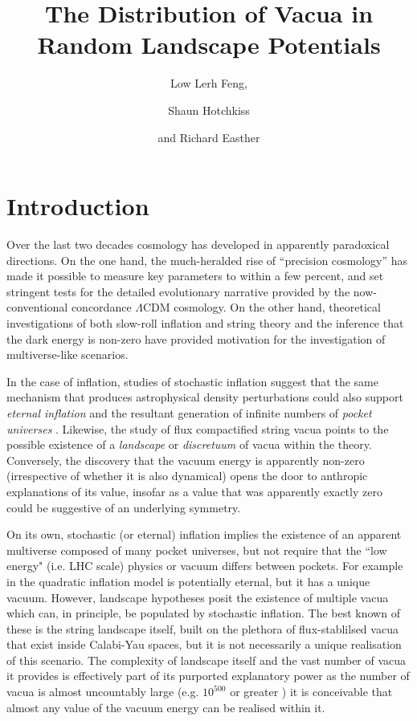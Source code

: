 \documentclass[12pt]{article}
\title{The Distribution of Vacua in Random Landscape Potentials}
\author{Low Lerh Feng,}
\author{Shaun Hotchkiss}
\author{and Richard Easther}
\affiliation{Department of Physics,\\ University of Auckland, \\Private Bag 92019,\\ Auckland, New Zealand}
\begin{document}
\maketitle

\section{Introduction}

Over the last two decades cosmology has developed in apparently paradoxical directions. On the one hand, the much-heralded rise of ``precision cosmology'' has made it possible to measure key parameters to within a few percent, and set stringent tests for the detailed evolutionary narrative provided by the now-conventional concordance $\Lambda$CDM cosmology\cite{Planck2018}\cite{DES}. On the other hand, theoretical investigations of both slow-roll inflation and string theory and the inference that the dark energy is non-zero have  provided motivation for the investigation of multiverse-like scenarios. 

In the case of inflation, studies of stochastic inflation \cite{Linde1986}\cite{Adshead2007} suggest that the same mechanism that produces astrophysical density perturbations could also support {\em eternal inflation\/} and the resultant generation of infinite numbers of  {\em pocket universes\/} \cite{Guth2001}. Likewise, the study of flux compactified string vacua points to the possible existence of a {\em landscape\/} \cite{Susskind2003} or {\em discretuum\/} \cite{Bousso2000}   of vacua within the theory. Conversely, the discovery that the vacuum energy is apparently non-zero (irrespective of whether it is also dynamical) opens the door to anthropic explanations of its value, insofar as a value that was apparently exactly zero could be suggestive of an underlying symmetry. 

On its own, stochastic (or eternal) inflation implies the existence of an apparent multiverse composed of many pocket universes, but not require that the ``low energy" (i.e. LHC scale) physics or vacuum  differs between pockets. For example in the quadratic inflation model is potentially eternal, but it has a unique vacuum.  However, landscape hypotheses posit the existence of multiple vacua which can, in principle, be populated by stochastic inflation. The best known of these is the string landscape itself, built on the plethora of flux-stablilsed vacua that exist inside Calabi-Yau spaces, but it is not necessarily a unique realisation of this scenario. The complexity of landscape itself and the vast number of vacua it provides is effectively part of its purported explanatory power as the number of vacua is almost uncountably large (e.g. $10^{500}$ or greater \cite{Douglas}) it is conceivable that almost any value of the vacuum energy can be realised within it. 
 
\end{document}
